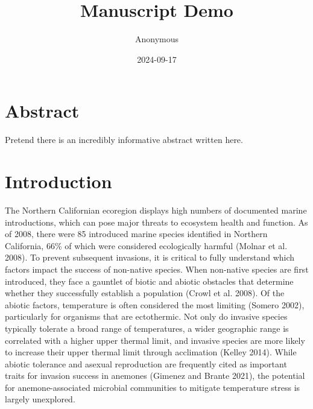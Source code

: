 \documentclass[
]{article}
\title{Manuscript Demo}
\author{Anonymous}
\date{2024-09-17}
\begin{document}
\maketitle

\hypertarget{abstract}{%
\section{Abstract}\label{abstract}}

Pretend there is an incredibly informative abstract written here.

\hypertarget{introduction}{%
\section{Introduction}\label{introduction}}

The Northern Californian ecoregion displays high numbers of documented
marine introductions, which can pose major threats to ecosystem health
and function. As of 2008, there were 85 introduced marine species
identified in Northern California, 66\% of which were considered
ecologically harmful (Molnar et al. 2008). To prevent subsequent
invasions, it is critical to fully understand which factors impact the
success of non-native species. When non-native species are first
introduced, they face a gauntlet of biotic and abiotic obstacles that
determine whether they successfully establish a population (Crowl et al.
2008). Of the abiotic factors, temperature is often considered the most
limiting (Somero 2002), particularly for organisms that are ectothermic.
Not only do invasive species typically tolerate a broad range of
temperatures, a wider geographic range is correlated with a higher upper
thermal limit, and invasive species are more likely to increase their
upper thermal limit through acclimation (Kelley 2014). While abiotic
tolerance and asexual reproduction are frequently cited as important
traits for invasion success in anemones (Gimenez and Brante 2021), the
potential for anemone-associated microbial communities to mitigate
temperature stress is largely unexplored.
\end{document}

